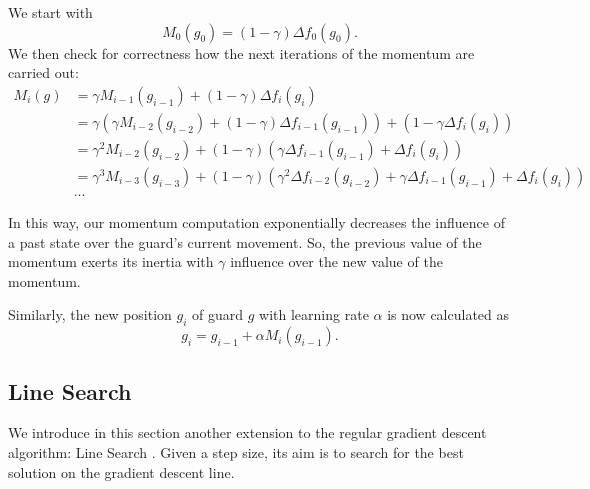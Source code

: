 We start with $$M_0(g_0) = (1 - \gamma) \Delta f_0(g_0).$$
We  then check for correctness how  the next iterations of the momentum are carried out:
\begin{align*}
    M_i(g) &= \gamma M_{i - 1}(g_{i - 1}) + (1 - \gamma) \Delta f_i(g_i) \\
        &= \gamma (\gamma M_{i - 2}(g_{i - 2}) + (1 - \gamma) \Delta f_{i - 1}(g_{i - 1})) + (1 - \gamma \Delta f_i(g_i)) \\ 
        &= \gamma^2 M_{i - 2}(g_{i - 2}) + (1 - \gamma)(\gamma \Delta f_{i - 1}(g_{i - 1}) + \Delta f_i(g_i)) \\
        &= \gamma^3 M_{i - 3}(g_{i - 3}) + (1 - \gamma)(\gamma^2 \Delta f_{i - 2}(g_{i - 2}) + \gamma \Delta f_{i - 1}(g_{i - 1}) + \Delta f_i(g_i)) \\
        &...
\end{align*}

In this way, our momentum computation exponentially decreases the influence of a past state over the guard's current movement. So, the previous value of the momentum  exerts its inertia with $\gamma$ influence over the new value of the momentum.

Similarly, the new position $g_i$ of guard $g$ with learning rate $\alpha$ is now calculated as $$g_i = g_{i - 1} + \alpha M_i(g_{i - 1}).$$

\subsection{Line Search}
\label{sec:line_search}
We introduce in this section another extension to the regular gradient descent algorithm: Line Search \cite{swann1969survey}. Given a step size, its aim is to search for the best solution on the gradient descent line. 

